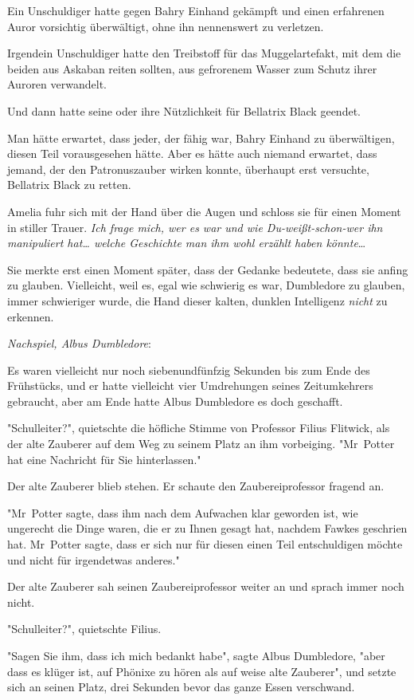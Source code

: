 {Ein Unschuldiger hatte gegen Bahry Einhand gekämpft und einen erfahrenen Auror vorsichtig überwältigt, ohne ihn nennenswert zu verletzen.

Irgendein Unschuldiger hatte den Treibstoff für das Muggelartefakt, mit dem die beiden aus Askaban reiten sollten, aus gefrorenem Wasser zum Schutz ihrer Auroren verwandelt.

Und dann hatte seine oder ihre Nützlichkeit für Bellatrix Black geendet.

Man hätte erwartet, dass jeder, der fähig war, Bahry Einhand zu überwältigen, diesen Teil vorausgesehen hätte. Aber es hätte auch niemand erwartet, dass jemand, der den Patronuszauber wirken konnte, überhaupt erst versuchte, Bellatrix Black zu retten.

Amelia fuhr sich mit der Hand über die Augen und schloss sie für einen Moment in stiller Trauer. \emph{Ich frage mich, wer es war und wie Du-weißt-schon-wer ihn manipuliert hat… welche Geschichte man ihm wohl erzählt haben könnte}…

Sie merkte erst einen Moment später, dass der Gedanke bedeutete, dass sie anfing zu glauben. Vielleicht, weil es, egal wie schwierig es war, Dumbledore zu glauben, immer schwieriger wurde, die Hand dieser kalten, dunklen Intelligenz \emph{nicht} zu erkennen.

\emph{Nachspiel, Albus Dumbledore}:

Es waren vielleicht nur noch siebenundfünfzig Sekunden bis zum Ende des Frühstücks, und er hatte vielleicht vier Umdrehungen seines Zeitumkehrers gebraucht, aber am Ende hatte Albus Dumbledore es doch geschafft.

"Schulleiter?", quietschte die höfliche Stimme von Professor Filius Flitwick, als der alte Zauberer auf dem Weg zu seinem Platz an ihm vorbeiging. "Mr~Potter hat eine Nachricht für Sie hinterlassen."

Der alte Zauberer blieb stehen. Er schaute den Zaubereiprofessor fragend an.

"Mr~Potter sagte, dass ihm nach dem Aufwachen klar geworden ist, wie ungerecht die Dinge waren, die er zu Ihnen gesagt hat, nachdem Fawkes geschrien hat. Mr~Potter sagte, dass er sich nur für diesen einen Teil entschuldigen möchte und nicht für irgendetwas anderes."

Der alte Zauberer sah seinen Zaubereiprofessor weiter an und sprach immer noch nicht.

"Schulleiter?", quietschte Filius.

"Sagen Sie ihm, dass ich mich bedankt habe", sagte Albus Dumbledore, "aber dass es klüger ist, auf Phönixe zu hören als auf weise alte Zauberer", und setzte sich an seinen Platz, drei Sekunden bevor das ganze Essen verschwand.

}
